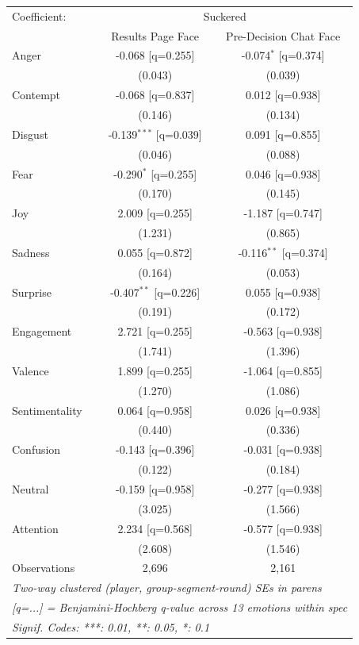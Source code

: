 \begingroup
\centering
\begin{tabular}{lcc}
   \tabularnewline \midrule \midrule
   Coefficient: & \multicolumn{2}{c}{Suckered}\\
    & Results Page Face & Pre-Decision Chat Face \\
   \midrule
   Anger & -0.068 [q=0.255] & -0.074$^{*}$ [q=0.374]\\
    & (0.043) & (0.039)\\
   Contempt & -0.068 [q=0.837] & 0.012 [q=0.938]\\
    & (0.146) & (0.134)\\
   Disgust & -0.139$^{***}$ [q=0.039] & 0.091 [q=0.855]\\
    & (0.046) & (0.088)\\
   Fear & -0.290$^{*}$ [q=0.255] & 0.046 [q=0.938]\\
    & (0.170) & (0.145)\\
   Joy & 2.009 [q=0.255] & -1.187 [q=0.747]\\
    & (1.231) & (0.865)\\
   Sadness & 0.055 [q=0.872] & -0.116$^{**}$ [q=0.374]\\
    & (0.164) & (0.053)\\
   Surprise & -0.407$^{**}$ [q=0.226] & 0.055 [q=0.938]\\
    & (0.191) & (0.172)\\
   Engagement & 2.721 [q=0.255] & -0.563 [q=0.938]\\
    & (1.741) & (1.396)\\
   Valence & 1.899 [q=0.255] & -1.064 [q=0.855]\\
    & (1.270) & (1.086)\\
   Sentimentality & 0.064 [q=0.958] & 0.026 [q=0.938]\\
    & (0.440) & (0.336)\\
   Confusion & -0.143 [q=0.396] & -0.031 [q=0.938]\\
    & (0.122) & (0.184)\\
   Neutral & -0.159 [q=0.958] & -0.277 [q=0.938]\\
    & (3.025) & (1.566)\\
   Attention & 2.234 [q=0.568] & -0.577 [q=0.938]\\
    & (2.608) & (1.546)\\
   \midrule
   Observations & 2,696 & 2,161\\
   \midrule \midrule
   \multicolumn{3}{l}{\emph{Two-way clustered (player, group-segment-round) SEs in parens}}\\
   \multicolumn{3}{l}{\emph{[q=...] = Benjamini-Hochberg q-value across 13 emotions within spec}}\\
   \multicolumn{3}{l}{\emph{Signif. Codes: ***: 0.01, **: 0.05, *: 0.1}}\\
\end{tabular}
\par\endgroup
